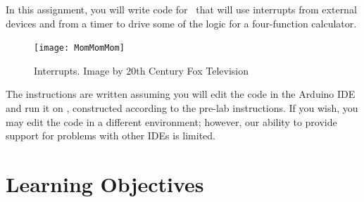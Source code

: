 


\usepackage{array,color,colortbl}
\usepackage{calc}

\renewcommand{\labnumber}{\capstonelabnumber}
\renewcommand{\labname}{Implementing a 4-Function Calculator using Interrupts}
\renewcommand{\shortlabname}{interrupt-driven i/o -- calculator -- grouplab}
\renewcommand{\collaborationrules}{\capstonelabcollaboration}
\renewcommand{\duedate}{\capstonelabdue}
\newcommand{\nano}{\developmentboard} %
\renewcommand{\runtimeenvironment}{\capstonelabenvironment}
\pagelayout

\labidentifier

In this assignment, you will write code for \runtimeenvironment\ that will use
interrupts from external devices and from a timer to drive some of the logic
for a four-function calculator.

\begin{figure}[h]
    \centering
    \texttt{[image: MomMomMom]}
    \caption{Interrupts. \tiny Image by 20th Century Fox Television}
\end{figure}

The instructions are written assuming you will edit the code in the Arduino IDE
and run it on \runtimeenvironment, constructed according to the pre-lab
instructions. If you wish, you may edit the code in a different environment;
however, our ability to provide support for problems with other IDEs is limited.

\section*{Learning Objectives}

